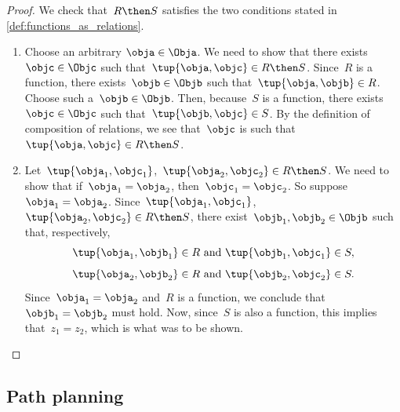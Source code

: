 \begin{proof}
We check that~$R \then S$ satisfies the two conditions stated in \cref{def:functions_as_relations}.

\begin{enumerate}
\item Choose an arbitrary $\obja \in \Obja$. We need to show that there exists~$\objc \in \Objc$ such that~$\tup{\obja,\objc} \in R \then S$.  Since~$R$ is a function, there exists~$\objb \in \Objb$ such that~$\tup{\obja,\objb} \in R$. Choose such a~$\objb \in \Objb$. Then, because~$S$ is a function, there exists~$\objc \in \Objc$ such that~$\tup{\objb,\objc} \in S$. By the definition of composition of relations, we see that~$\objc$ is such that~$\tup{\obja,\objc} \in R \then S$.
\item Let~$\tup{\obja_1, \objc_1}$,~$\tup{\obja_2,\objc_2} \in R \then S$. We need to show that if~$\obja_1 = \obja_2$, then~$\objc_1 = \objc_2$. So suppose~$\obja_1 = \obja_2$. Since~$\tup{\obja_1, \objc_1}$,~$\tup{\obja_2,\objc_2} \in R \then S$, there exist~$\objb_1, \objb_2 \in \Objb$ such that, respectively,
\begin{equation*}
\tup{\obja_1, \objb_1} \in R \text{ and } \tup{\objb_1, \objc_1} \in S,
\end{equation*}
\begin{equation*}
\tup{\obja_2, \objb_2} \in R \text{ and } \tup{\objb_2, \objc_2} \in S.
\end{equation*}
Since~$\obja_1 = \obja_2$ and~$R$ is a function, we conclude that~$\objb_1 = \objb_2$ must hold. Now, since~$S$ is also a function, this implies that~$z_1 = z_2$, which is what was to be shown.
\end{enumerate}
\end{proof}

\subsection{Path planning}
\label{sec:trekking}



